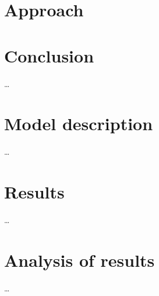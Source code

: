 \section*{Approach}



\section*{Conclusion} 
\ldots

\section*{Model description}
\ldots

\section*{Results}
\ldots

\section*{Analysis of results}
\ldots

\printrefsegment
